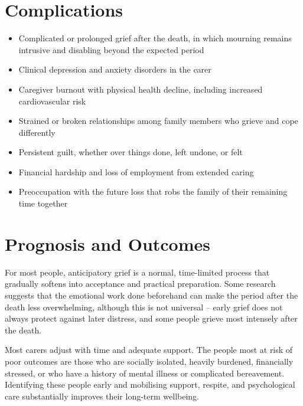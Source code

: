 \section*{Complications}
\begin{itemize}
    \item Complicated or prolonged grief after the death, in which mourning remains intrusive and disabling beyond the expected period
    \item Clinical depression and anxiety disorders in the carer
    \item Caregiver burnout with physical health decline, including increased cardiovascular risk
    \item Strained or broken relationships among family members who grieve and cope differently
    \item Persistent guilt, whether over things done, left undone, or felt
    \item Financial hardship and loss of employment from extended caring
    \item Preoccupation with the future loss that robs the family of their remaining time together
\end{itemize}

\section*{Prognosis and Outcomes}
For most people, anticipatory grief is a normal, time-limited process that gradually softens into acceptance and practical preparation. Some research suggests that the emotional work done beforehand can make the period after the death less overwhelming, although this is not universal -- early grief does not always protect against later distress, and some people grieve most intensely after the death.

Most carers adjust with time and adequate support. The people most at risk of poor outcomes are those who are socially isolated, heavily burdened, financially stressed, or who have a history of mental illness or complicated bereavement. Identifying these people early and mobilising support, respite, and psychological care substantially improves their long-term wellbeing.

